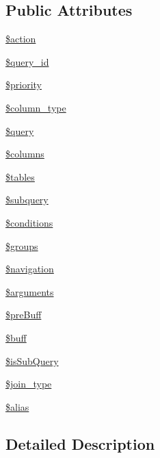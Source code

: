 \subsection*{Public Attributes}
\begin{DoxyCompactItemize}
\item 
\hyperlink{classQueryTag_a5e2e78261306a4a4db69c643e9524e60}{\$action}
\item 
\hyperlink{classQueryTag_ac9ddaab237f51a26128e5f4d2869a430}{\$query\-\_\-id}
\item 
\hyperlink{classQueryTag_ac09e6c0124ba1d5945c7f93232e13827}{\$priority}
\item 
\hyperlink{classQueryTag_a617db2d7a2db9fddba0959b43cc40458}{\$column\-\_\-type}
\item 
\hyperlink{classQueryTag_a40fbf27ebaa31f5430080152164c3bae}{\$query}
\item 
\hyperlink{classQueryTag_a375d57839b60d616ed27af9f42acd3a1}{\$columns}
\item 
\hyperlink{classQueryTag_aed79c0c40d39fe9042ade3b23b6e172e}{\$tables}
\item 
\hyperlink{classQueryTag_a1fb40050f2484c2daa9e77cf53d11c15}{\$subquery}
\item 
\hyperlink{classQueryTag_a7cf9adc98dec4da0e67c1dcd25b7e5b5}{\$conditions}
\item 
\hyperlink{classQueryTag_aa456465c5358ae400751727cd943683e}{\$groups}
\item 
\hyperlink{classQueryTag_a60f53db40ea035c8e9c88ab2681e3792}{\$navigation}
\item 
\hyperlink{classQueryTag_a236e4bf42871aeac6c84f4dbbd1e6cb2}{\$arguments}
\item 
\hyperlink{classQueryTag_ac51df39445e0b132d1fa388c01ebf56d}{\$pre\-Buff}
\item 
\hyperlink{classQueryTag_abe10d8fd334fac380dd5540b2c0bdcc8}{\$buff}
\item 
\hyperlink{classQueryTag_ac657cdbbef0ca8f1907197cbf91f1040}{\$is\-Sub\-Query}
\item 
\hyperlink{classQueryTag_a8ab11b51470b725b766e2d53bb947ba4}{\$join\-\_\-type}
\item 
\hyperlink{classQueryTag_a86de241a75c3037c30272c7eb4a2cfbc}{\$alias}
\end{DoxyCompactItemize}


\subsection{Detailed Description}


